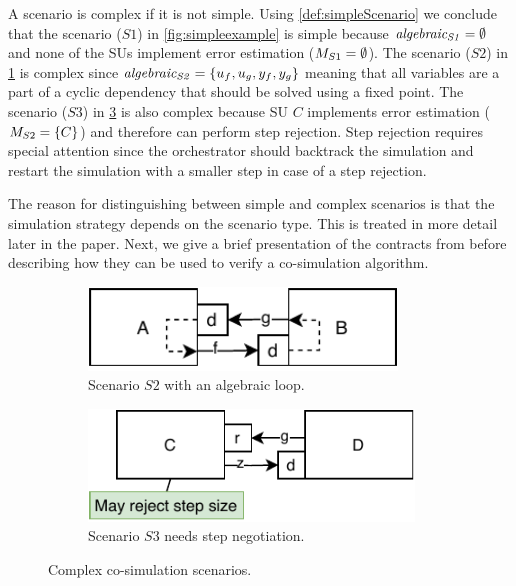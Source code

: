 A scenario is complex if it is not simple. Using \cref{def:simpleScenario} we conclude that the scenario ($S1$) in \cref{fig:simpleexample} is simple because $\mathit{algebraic_{S1}}=\emptyset$ and none of the SUs implement error estimation ($M_{S1}=\emptyset$). The scenario ($S2$) in \cref{fig:algebraic_example} is complex since $\mathit{algebraic_{S2}}=\{u_{f}, u_{g}, y_{f}, y_{g}\}$ meaning that all variables are a part of a cyclic dependency that should be solved using a fixed point.
The scenario ($S3$) in \cref{fig:step_finding_scenario} is also complex because SU $C$ implements error estimation ($M_{S2}=\{C\}$) and therefore can perform step rejection. Step rejection requires special attention since the orchestrator should backtrack the simulation and restart the simulation with a smaller step in case of a step rejection.

The reason for distinguishing between simple and complex scenarios is that the simulation strategy depends on the scenario type. This is treated in more detail later in the paper.
Next, we give a brief presentation of the contracts from \cite{Gomes2019a} before describing how they can be used to verify a co-simulation algorithm.

\begin{figure}[htb]
  \begin{subfigure}{0.48\textwidth}
    \centering
    \centering
    \includegraphics[width=0.9\textwidth]{images/scenario_algebraic.pdf}
    \caption{Scenario $S2$ with an algebraic loop.}
    \label{fig:algebraic_example}
  \end{subfigure}
  \begin{subfigure}{.48\textwidth}
    \centering
    \includegraphics[width=0.95\textwidth]{images/step_negotiation_scenario.pdf}
    \caption{Scenario $S3$ needs step negotiation.}
    \label{fig:step_finding_scenario}
    \end{subfigure} 
    \caption{Complex co-simulation scenarios.}
    \vspace{-2em}

  \end{figure}

